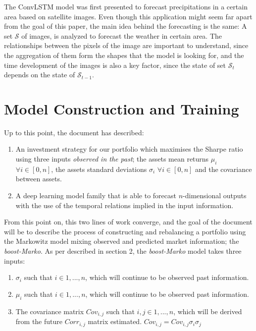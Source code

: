 \documentclass{article}
\newcommand\mat[1]{\mathcal{#1}}
\begin{document}
The ConvLSTM model was first presented to forecast precipitations in a certain area based on satellite images. Even though this application might seem far apart from the goal of this paper, the main idea behind the forecasting is the same: A set $\mat{S}$ of images, is analyzed to forecast the weather in certain area. The relationships between the pixels of the image are important to understand, since the aggregation of them form the shapes that the model is looking for, and the time development of the images is also a key factor, since the state of set $\mat{S}_{t}$ depends on the state of $\mat{S}_{t-1}$.
\section{Model Construction and Training}

Up to this point, the document has described:
\begin{enumerate}
    \item An investment strategy for our portfolio which maximises the Sharpe ratio using three inputs \textit{observed in the past}; the assets mean returns $\mu_{i}$ $\forall i\in[0,n]$, the assets standard deviations $\sigma_{i}$ $\forall i\in[0,n]$ and the covariance between assets.
    \item A deep learning model family that is able to forecast $n$-dimensional outputs with the use of the temporal relations implied in the input information.
\end{enumerate}

From this point on, this two lines of work converge, and the goal of the document will be to describe the process of constructing and rebalancing a portfolio using the Markowitz model mixing observed and  predicted market information; the \textit{boost-Marko}. As per described in section 2, the \textit{boost-Marko} model takes three inputs:
\begin{enumerate}[label=(\textbf{\alph*})]
    \item $\sigma_{i}$ such that $i \in {1,...,n}$, which will continue to be observed past information.
    \item $\mu_{i}$ such that $i \in {1,...,n}$,  which will continue to be observed past information.
    \item The covariance matrix $Cov_{i,j}$ such that $i,j \in {1,...,n}$, which will be derived from the future $Corr_{i,j}$ matrix estimated. $Cov_{i,j} = Cov_{i,j}\sigma_{i}\sigma_{j}$
\end{enumerate}
\end{document}
